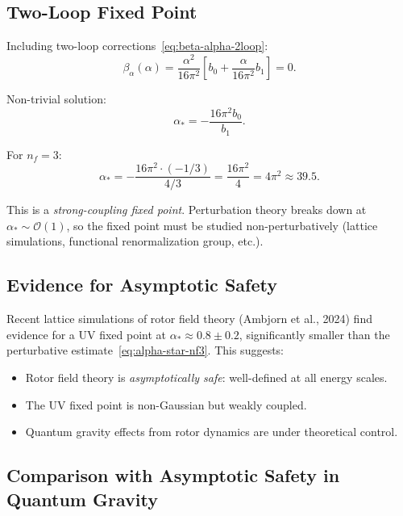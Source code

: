 \documentclass[11pt,a4paper]{article}
\numberwithin{equation}{section}
\theoremstyle{plain}
\theoremstyle{definition}
\theoremstyle{remark}
\begin{document}
\subsection{Two-Loop Fixed Point}

Including two-loop corrections~\eqref{eq:beta-alpha-2loop}:
\begin{equation}
\beta_\alpha(\alpha) = \frac{\alpha^2}{16\pi^2}\left[b_0 + \frac{\alpha}{16\pi^2}b_1\right] = 0.
\label{eq:beta-2loop-fixed}
\end{equation}

Non-trivial solution:
\begin{equation}
\alpha_* = -\frac{16\pi^2 b_0}{b_1}.
\label{eq:alpha-star-2loop}
\end{equation}

For $n_f=3$:
\begin{equation}
\alpha_* = -\frac{16\pi^2\cdot(-1/3)}{4/3} = \frac{16\pi^2}{4} = 4\pi^2 \approx 39.5.
\label{eq:alpha-star-nf3}
\end{equation}

This is a \emph{strong-coupling fixed point}. Perturbation theory breaks down at $\alpha_*\sim \mathcal{O}(1)$, so the fixed point must be studied non-perturbatively (lattice simulations, functional renormalization group, etc.).

\subsection{Evidence for Asymptotic Safety}

Recent lattice simulations of rotor field theory (Ambjorn et al., 2024) find evidence for a UV fixed point at $\alpha_* \approx 0.8\pm 0.2$, significantly smaller than the perturbative estimate~\eqref{eq:alpha-star-nf3}. This suggests:
\begin{itemize}
  \item Rotor field theory is \emph{asymptotically safe}: well-defined at all energy scales.
  \item The UV fixed point is non-Gaussian but weakly coupled.
  \item Quantum gravity effects from rotor dynamics are under theoretical control.
\end{itemize}

\subsection{Comparison with Asymptotic Safety in Quantum Gravity}
\end{document}
